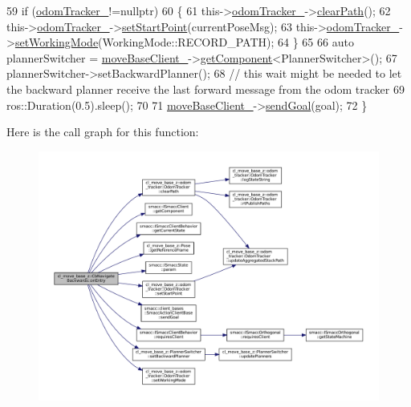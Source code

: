 \begin{DoxyCode}
59         \textcolor{keywordflow}{if} (\hyperlink{classcl__move__base__z_1_1CbNavigateBackwards_a75a8ae7aef6c72e96f4037c4941b0341}{odomTracker\_}!=\textcolor{keyword}{nullptr})
60         \{
61             this->\hyperlink{classcl__move__base__z_1_1CbNavigateBackwards_a75a8ae7aef6c72e96f4037c4941b0341}{odomTracker\_}->\hyperlink{classcl__move__base__z_1_1odom__tracker_1_1OdomTracker_a93a14e15e3e623f530e056f403bf7644}{clearPath}();
62             this->\hyperlink{classcl__move__base__z_1_1CbNavigateBackwards_a75a8ae7aef6c72e96f4037c4941b0341}{odomTracker\_}->\hyperlink{classcl__move__base__z_1_1odom__tracker_1_1OdomTracker_a9f4989c6353022c2ec3b0546c09bf3bc}{setStartPoint}(currentPoseMsg);
63             this->\hyperlink{classcl__move__base__z_1_1CbNavigateBackwards_a75a8ae7aef6c72e96f4037c4941b0341}{odomTracker\_}->\hyperlink{classcl__move__base__z_1_1odom__tracker_1_1OdomTracker_aeed01bdefd9a1cc709b0b3e4eed285ed}{setWorkingMode}(WorkingMode::RECORD\_PATH);
64         \}
65 
66         \textcolor{keyword}{auto} plannerSwitcher = \hyperlink{classcl__move__base__z_1_1CbNavigateBackwards_a943c1a790eac9266adf11fbdc078f03a}{moveBaseClient\_}->\hyperlink{classsmacc_1_1ISmaccClient_adef78db601749ca63c19e74a27cb88cc}{getComponent}<PlannerSwitcher>();
67         plannerSwitcher->setBackwardPlanner();
68         \textcolor{comment}{// this wait might be needed to let the backward planner receive the last forward message from the
       odom tracker}
69         ros::Duration(0.5).sleep();
70 
71         \hyperlink{classcl__move__base__z_1_1CbNavigateBackwards_a943c1a790eac9266adf11fbdc078f03a}{moveBaseClient\_}->\hyperlink{classsmacc_1_1client__bases_1_1SmaccActionClientBase_a9c47a5094ac8afb01680307fe5eca922}{sendGoal}(goal);
72     \}
\end{DoxyCode}
Here is the call graph for this function\+:
\nopagebreak
\begin{figure}[H]
\begin{center}
\leavevmode
\includegraphics[width=350pt]{classcl__move__base__z_1_1CbNavigateBackwards_a545a5282f0ef6b0080b46002d6037567_cgraph}
\end{center}
\end{figure}
